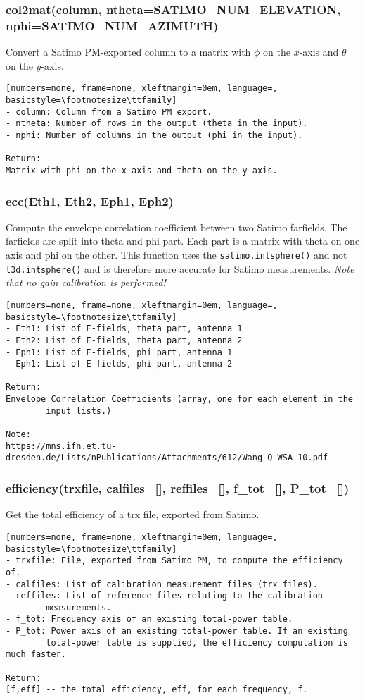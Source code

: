 \subsubsection{col2mat(column, ntheta=SATIMO\_NUM\_ELEVATION, nphi=SATIMO\_NUM\_AZIMUTH)}
Convert a Satimo PM-exported column to a matrix with $\phi$ on the 
$x$-axis and $\theta$ on the $y$-axis.

\begin{lstlisting}[numbers=none, frame=none, xleftmargin=0em, language=, basicstyle=\footnotesize\ttfamily]
- column: Column from a Satimo PM export.
- ntheta: Number of rows in the output (theta in the input).
- nphi: Number of columns in the output (phi in the input).

Return:
Matrix with phi on the x-axis and theta on the y-axis.
\end{lstlisting}

\subsubsection{ecc(Eth1, Eth2, Eph1, Eph2)}
Compute the envelope correlation coefficient between two Satimo farfields.
The farfields are split into theta and phi part. Each part is a matrix with
theta on one axis and phi on the other. This function uses the
\texttt{satimo.intsphere()} and not \texttt{l3d.intsphere()} and is therefore
more accurate for Satimo measurements. \emph{Note that no gain calibration is
performed!}

\begin{lstlisting}[numbers=none, frame=none, xleftmargin=0em, language=, basicstyle=\footnotesize\ttfamily]
- Eth1: List of E-fields, theta part, antenna 1
- Eth2: List of E-fields, theta part, antenna 2
- Eph1: List of E-fields, phi part, antenna 1
- Eph1: List of E-fields, phi part, antenna 2

Return:
Envelope Correlation Coefficients (array, one for each element in the
        input lists.)

Note:
https://mns.ifn.et.tu-dresden.de/Lists/nPublications/Attachments/612/Wang_Q_WSA_10.pdf
\end{lstlisting}

\subsubsection{efficiency(trxfile, calfiles=[], reffiles=[], f\_tot=[], P\_tot=[])}
Get the total efficiency of a trx file, exported from Satimo.

\begin{lstlisting}[numbers=none, frame=none, xleftmargin=0em, language=, basicstyle=\footnotesize\ttfamily]
- trxfile: File, exported from Satimo PM, to compute the efficiency of.
- calfiles: List of calibration measurement files (trx files).
- reffiles: List of reference files relating to the calibration
        measurements.
- f_tot: Frequency axis of an existing total-power table.
- P_tot: Power axis of an existing total-power table. If an existing
        total-power table is supplied, the efficiency computation is much faster.

Return:
[f,eff] -- the total efficiency, eff, for each frequency, f.
\end{lstlisting}

